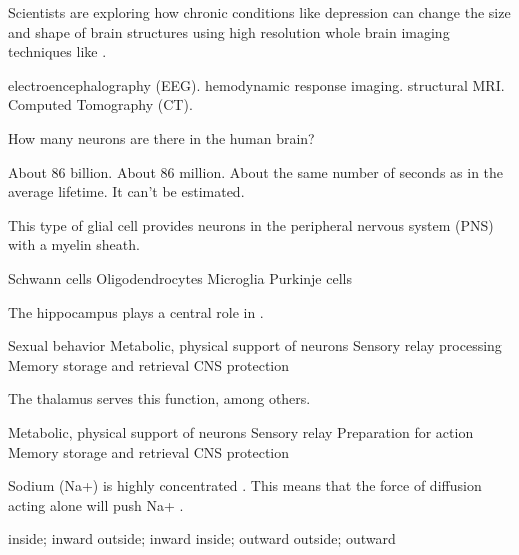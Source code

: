 \documentclass[answers]{exam}
\begin{document}
\begin{questions}
\newpage

\question Scientists are exploring how chronic conditions like depression can change the size and shape of brain structures using high resolution whole brain imaging techniques like \fillin.
\begin{choices}
\choice electroencephalography (EEG).
\choice hemodynamic response imaging.
\correctchoice structural MRI.
\choice Computed Tomography (CT).
\end{choices}

\question How many neurons are there in the human brain?
\begin{choices}
\correctchoice About 86 billion.
\choice About 86 million.
\choice About the same number of seconds as in the average lifetime.
\choice It can't be estimated.
\end{choices}

\question This type of glial cell provides neurons in the peripheral nervous system (PNS) with a myelin sheath.
\begin{choices}
\correctchoice Schwann cells
\choice Oligodendrocytes
\choice Microglia
\choice Purkinje cells
\end{choices}

\question The hippocampus plays a central role in \fillin.
\begin{choices}
\choice Sexual behavior
\choice Metabolic, physical support of neurons
\choice Sensory relay processing
\correctchoice Memory storage and retrieval
\choice CNS protection
\end{choices}

\question The thalamus serves this function, among others.
\begin{choices}
\choice Metabolic, physical support of neurons
\correctchoice Sensory relay
\choice Preparation for action
\choice Memory storage and retrieval
\choice CNS protection
\end{choices}


\question Sodium (Na+) is highly concentrated \fillin. This means that the force of diffusion acting alone will push Na+ \fillin.
\begin{choices}
\choice inside; inward
\correctchoice outside; inward
\choice inside; outward
\choice outside; outward
\end{choices}


\end{questions}
\end{document}

